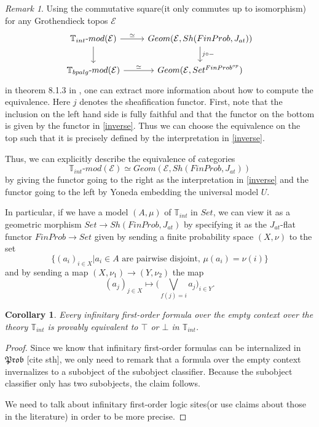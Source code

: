 \documentclass[a4paper]{amsproc}
\theoremstyle{plain}
\newtheorem{corollary}[theorem]{Corollary}
\theoremstyle{definition}
\theoremstyle{remark}
\newtheorem{remark}[theorem]{Remark}
\numberwithin{equation}{section}
\begin{document}
\begin{remark} \label{classifying_equiv_data}
Using the commutative square(it only commutes up to isomorphism) for any Grothendieck topos $\mathcal{E}$
\[
\begin{tikzcd}
\mathbb{T}_{int}\text{-}mod(\mathcal{E}) \arrow[d] \arrow[r, "\simeq"] & {Geom(\mathcal{E},Sh(FinProb,J_{at}))} \arrow[d, "j \circ -"] \\
\mathbb{T}_{bpalg}\text{-}mod(\mathcal{E}) \arrow[r, "\simeq"]         & {Geom(\mathcal{E},Set^{FinProb^{op}})}                       
\end{tikzcd}
\]
in theorem 8.1.3 in \cite{caramello_book}, one can extract more information about how to compute the equivalence. Here $j$ denotes the sheafification functor. First, note that the inclusion on the left hand side is fully faithful and that the functor on the bottom is given by the functor in \ref{inverse}. Thus we can choose the equivalence on the top such that it is precisely defined by the interpretation in \ref{inverse}.

Thus, we can explicitly describe the equivalence of categories
\[
    \mathbb{T}_{int}\text{-}mod(\mathcal{E}) \simeq Geom(\mathcal{E},Sh(FinProb,J_{at}))
\]
by giving the functor going to the right as the interpretation in \ref{inverse} and the functor going to the left by Yoneda embedding the universal model $U$.

In particular, if we have a model $(A,\mu)$ of $\mathbb{T}_{int}$ in $Set$, we can view it as a geometric morphism $Set \to Sh(FinProb, J_{at})$ by specifying it as the $J_{at}$-flat functor $FinProb \to Set$ given by sending a finite probability space $(X,\nu)$ to the set
\[
\{(a_i)_{i \in X} | a_i \in A \text{ are pairwise disjoint, } \mu(a_i) = \nu(i) \}
\]
and by sending a map $(X,\nu_1) \to (Y,\nu_2)$ the map
\[
(a_j)_{j \in X} \mapsto \big (\bigvee_{f(j) = i} a_j \big )_{i \in Y} .
\]
\end{remark}

\begin{corollary}
Every infinitary first-order formula over the empty context over the theory $\mathbb{T}_{int}$ is provably equivalent to $\top$ or $\bot$ in $\mathbb{T}_{int}$.
\end{corollary}
\begin{proof}
    Since we know that infinitary first-order formulas can be internalized in $\mathfrak{Prob}$ [cite sth], we only need to remark that a formula over the empty context invernalizes to a subobject of the subobject classifier. Because the subobject classifier only has two subobjects, the claim follows.
    
    We need to talk about infinitary first-order logic sites(or use claims about those in the literature) in order to be more precise.
\end{proof}
\end{document}
